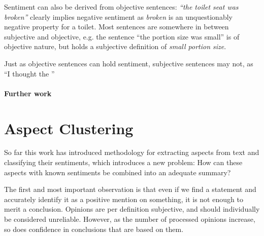 \documentclass[a4paper,11pt]{kth-mag}
\begin{document}
Sentiment can also be derived from objective sentences: \emph{``the toilet seat was broken''} clearly implies negative sentiment as \emph{broken} is an unquestionably negative property for a toilet. Most sentences are somewhere in between subjective and objective, e.g. the sentence ``the portion size was small'' is of objective nature, but holds a subjective definition of \emph{small portion size}.

Just as objective sentences can hold sentiment, subjective sentences may not, as ``I thought the ''


\subsubsection{Further work}









\chapter{Aspect Clustering}
So far this work has introduced methodology for extracting aspects from text and classifying their sentiments, which introduces a new problem: How can these aspects with known sentiments be combined into an adequate summary?

The first and most important observation is that even if we find a statement and accurately identify it as a positive mention on something, it is not enough to merit a conclusion. Opinions are per definition subjective, and should individually be considered unreliable. However, as the number of processed opinions increase, so does confidence in conclusions that are based on them.
\end{document}
